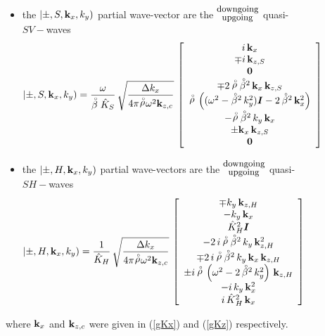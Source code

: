 \begin{figure}
{\begin{minipage} {140.0mm}
\begin{itemize}
\item the $\left|\pm,S, {\bf k}_x ,k_y \right)$ partial wave-vector 
are the   ${\stackrel{\mbox{\small downgoing}}{{}_{\mbox{\small 
upgoing}}}}$  quasi-$SV-$waves 
\begin{equation} \label{hatSVeigen}
\left|\pm,S, {\bf k}_x ,k_y \right)=\frac{\omega }{\stackrel{\scriptscriptstyle _{\,\,\circ}}{ \beta} \hat{K}_{S}}\,
\sqrt{\frac{{ \Delta} k_{x}}{{4 \pi {\stackrel{\scriptscriptstyle _{\,\,\circ}}{ \rho}} {\omega 
}^{  2}{\bf  k}_{  
z, c }}}}\,
\left[\begin{array}{c} 
i\,{\bf k}_{x}\\
\mp i\,{\bf k}_{z,S}\\ {\bf 0} \\
\mp 2\,{\stackrel{\scriptscriptstyle _{\,\,\circ}}{ \rho}}\,{{\stackrel{\scriptscriptstyle _{\,\,\circ}}{ \beta}}{}^{2}}\,{\bf k}_{x}\,{\bf k}_{z,S} \\
  {\stackrel{\scriptscriptstyle _{\,\,\circ}}{ \rho}} \,\left(({\omega^2} - {{\stackrel{\scriptscriptstyle _{\,\,\circ}}{ \beta}}{}^{2}}\,{k_{y}^2}) {\mbox{\boldmath$\mit I$\unboldmath}}-2\,{{\stackrel{\scriptscriptstyle _{\,\,\circ}}{ \beta}}{}^{2}}\,{{\bf k}_{x}^2}   \right) \\
  -{\stackrel{\scriptscriptstyle _{\,\,\circ}}{ \rho}}\,{{\stackrel{\scriptscriptstyle _{\,\,\circ}}{ \beta}}{}^{2}}\,k_{y}\,{\bf k}_{x}\\ \pm {{\bf k}_{x}}\,{\bf 
  k}_{z,S}\\{\bf 0} \end{array}\right]
\end{equation}

\item the $\left|\pm,H, {\bf k}_x ,k_y \right)$ partial wave-vectors 
are the   ${\stackrel{\mbox{\small downgoing}}{{}_{\mbox{\small 
upgoing}}}}$  quasi-$SH-$waves 
\begin{equation} \label{hatSHeigen}
\left|\pm,H, {\bf k}_x ,k_y \right)=\frac{1 }{\hat{K}_{H}}\,
\sqrt{\frac{{ \Delta} k_{x}}{{4 \pi {\stackrel{\scriptscriptstyle _{\,\,\circ}}{ \rho}} {\omega 
}^{  2}{\bf  k}_{  
z, c }}}}\,
\left[\begin{array}{c} 
\mp k_{y}\,{\bf k}_{z,H} \\-k_{y}\,{\bf k}_{x} \\
  \hat{K}_{H}^2 {\mbox{\boldmath$\mit I$\unboldmath}}\\
-2\,i\,{\stackrel{\scriptscriptstyle _{\,\,\circ}}{ \rho}} \,{{\stackrel{\scriptscriptstyle _{\,\,\circ}}{ \beta}}{}^{2}}\,k_{y}\,{{\bf k}_{z,H}^2}\\
  \mp 2\,i\,{\stackrel{\scriptscriptstyle _{\,\,\circ}}{ \rho}}\,{{\stackrel{\scriptscriptstyle _{\,\,\circ}}{ \beta}}{}^{2}}\,k_{y}\,{\bf k}_{x}\,{\bf k}_{z,H} \\
  \pm i\,{\stackrel{\scriptscriptstyle _{\,\,\circ}}{ \rho}}\,\left(  {\omega^2} -2\,{{\stackrel{\scriptscriptstyle _{\,\,\circ}}{ \beta}}{}^{2}}\,{k_{y}^2} 
  \right)\,{\bf k}_{z,H} \\
  -i\,{k}_{y}\,{\bf k}^{2}_{x}\\i\,\hat{K}{}^{2}_{H}\,{\bf k}_{x} \end{array}\right]
\end{equation}
\end{itemize}
where  ${\bf  k}_{x}$ and ${\bf  k}_{z,c}$ were given in
(\ref{gKx}) and (\ref{gKz}) respectively. 
\vspace{2 mm}
\end{minipage}
}
\end{figure}



